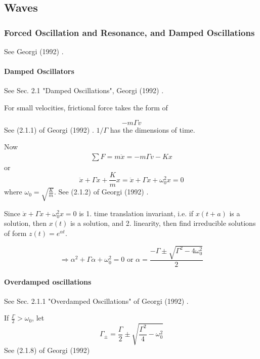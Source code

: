 \documentclass[10pt]{amsart}
\begin{document}
\begin{multicols*}{2}
\part{Waves}

\section{Forced Oscillation and Resonance, and Damped Oscillations}

See Georgi (1992) \cite{Geor1992}.

\subsection{Damped Oscillators}

See Sec. 2.1 "Damped Oscillations", Georgi (1992) \cite{Geor1992}.

For small velocities, frictional force takes the form of

\begin{equation}
	-m\Gamma v
\end{equation}
See (2.1.1) of Georgi (1992) \cite{Geor1992}. $1/\Gamma$ has the dimensions of time.

Now
\[
\begin{gathered}
	\sum F = m\ddot{x} = -m \Gamma v - Kx
\end{gathered}
\]
or
\begin{equation}
	\ddot{x} + \Gamma \dot{x} + \frac{K}{m} x = \ddot{x} + \Gamma \dot{x} + \omega_0^2 x = 0
\end{equation}
where $\omega_0 = \sqrt{ \frac{K}{m} }$. See (2.1.2) of Georgi (1992) \cite{Geor1992}.

Since $\ddot{x} + \Gamma \dot{x} + \omega_0^2 x = 0$ is 1. time translation invariant, i.e. if $x(t+a)$ is a solution, then $x(t)$ is a solution, and 2. linearity, then find irreducible solutions of form $z(t) = e^{\alpha t}$.

\[
\Longrightarrow \alpha^2 + \Gamma \alpha + \omega_0^2 =0 \text{ or } \alpha = \frac{ -\Gamma \pm \sqrt{ \Gamma^2 - 4\omega_0^2}}{2}
\]

\subsection{Overdamped oscillations} See Sec. 2.1.1 "Overdamped Oscillations" of Georgi (1992) \cite{Geor1992}.

If $\frac{\Gamma}{2} > \omega_0$, let
\begin{equation}
	\Gamma_{\pm} = \frac{\Gamma}{2} \pm \sqrt{ \frac{\Gamma^2}{4} - \omega_0^2}
\end{equation}
See (2.1.8) of Georgi (1992) \cite{Geor1992}


\end{multicols*}
\end{document}
